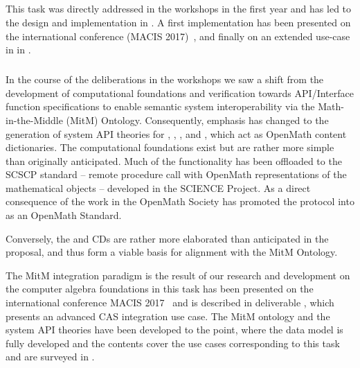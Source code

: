 \subparagraph{}

This task was directly addressed in the  workshops in the first year and has led to the design and implementation in . A first implementation has been presented on the international conference (MACIS 2017)~\cite{WieKohRab:vtuimkb17}, and finally on an extended use-case in \LMFDB in .
 \medskip

\subparagraph{}

In the course of the deliberations in the  workshops we saw a shift from the development of computational foundations and verification towards API/Interface function specifications to enable semantic system interoperability via the Math-in-the-Middle (MitM) Ontology.
Consequently, emphasis has changed to the generation of system API theories for \GAP, \Sage, \Singular, and \LMFDB, which act as OpenMath content dictionaries.
The computational foundations exist but are rather more simple than originally anticipated.
Much of the functionality has been offloaded to the SCSCP standard -- remote procedure call with OpenMath representations of the mathematical objects -- developed in the SCIENCE Project.
As a direct consequence of the work in \pn the OpenMath Society has promoted the \SCSCP protocol into as an OpenMath Standard.

Conversely, the \GAP and \Sage CDs are rather more elaborated than anticipated in the proposal, and thus form a viable basis for alignment with the MitM Ontology.

The MitM integration paradigm is the result of our research and development on the computer algebra foundations in this task has been presented on the international conference MACIS 2017~\cite{KohMuePfe:kbimss17} and is described in deliverable , which presents an advanced CAS integration use case. 
The MitM ontology and the system API theories have been developed to the point, where the data model is fully developed and the contents cover the use cases corresponding to this task and  are surveyed in .
\medskip

\subparagraph{}

